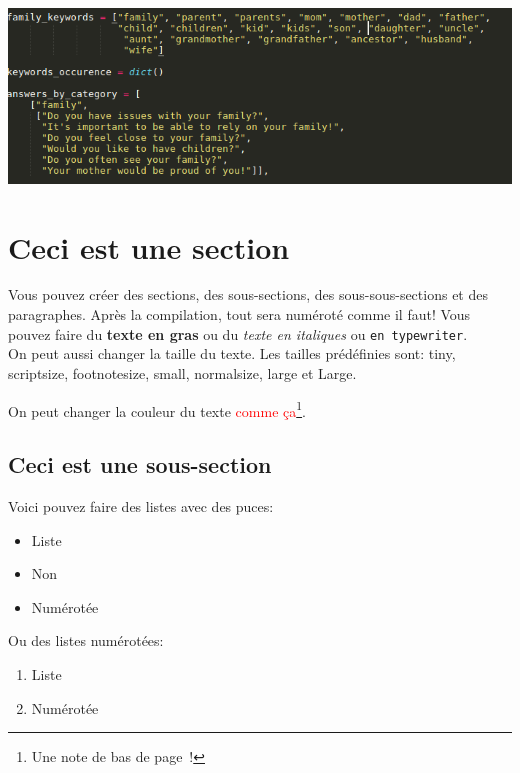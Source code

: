 \documentclass[paper=a4, fontsize=11pt]{article}
\begin{document}
\begin{center}
\includegraphics[width=691pt]{MeanBot_mode2_keywords.png}
\end{center}

\section{Ceci est une section}
Vous pouvez créer des sections, des sous-sections, des sous-sous-sections et des paragraphes. Après
la compilation, tout sera numéroté comme il faut! Vous pouvez faire du \textbf{texte en gras} ou du
\textit{texte en italiques} ou \texttt{en typewriter}. \\

On peut aussi {\small changer} {\large la taille} {\tiny du texte}.  Les tailles prédéfinies sont:
{\tiny tiny}, {\scriptsize scriptsize}, {\footnotesize footnotesize}, {\small small}, {\normalsize
  normalsize}, {\large large} et {\Large Large}.

On peut changer la couleur du texte \textcolor{red}{comme
  ça}\footnote{Une note de bas de page~!}.

\subsection{Ceci est une sous-section}
Voici pouvez faire des listes avec des puces:

\begin{itemize}
\item Liste
\item Non
\item Numérotée
\end{itemize}

\vspace{0.5cm} %

Ou des listes numérotées:
\begin{enumerate}
\item Liste
\item Numérotée
\end{enumerate}
\end{document}

